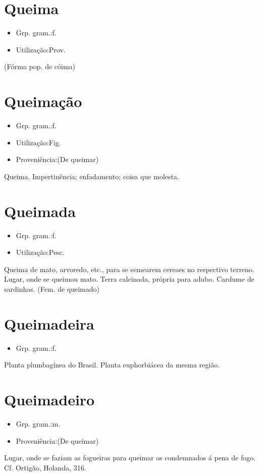 \section{Queima}
\begin{itemize}
\item {Grp. gram.:f.}
\end{itemize}
\begin{itemize}
\item {Utilização:Prov.}
\end{itemize}
(Fórma pop. de \textunderscore cóima\textunderscore )
\section{Queimação}
\begin{itemize}
\item {Grp. gram.:f.}
\end{itemize}
\begin{itemize}
\item {Utilização:Fig.}
\end{itemize}
\begin{itemize}
\item {Proveniência:(De \textunderscore queimar\textunderscore )}
\end{itemize}
Queima.
Impertinência; enfadamento; coisa que molesta.
\section{Queimada}
\begin{itemize}
\item {Grp. gram.:f.}
\end{itemize}
\begin{itemize}
\item {Utilização:Pesc.}
\end{itemize}
Queima de mato, arvoredo, etc., para se semearem cereaes no respectivo terreno.
Lugar, onde se queimou mato.
Terra calcinada, própria para adubo.
Cardume de sardinhas.
(Fem. de \textunderscore queimado\textunderscore )
\section{Queimadeira}
\begin{itemize}
\item {Grp. gram.:f.}
\end{itemize}
Planta plumbagínea do Brasil.
Planta euphorbiácea da mesma região.
\section{Queimadeiro}
\begin{itemize}
\item {Grp. gram.:m.}
\end{itemize}
\begin{itemize}
\item {Proveniência:(De \textunderscore queimar\textunderscore )}
\end{itemize}
Lugar, onde se faziam as fogueiras para queimar os condemnados á pena de fogo. Cf. Ortigão, \textunderscore Holanda\textunderscore , 316.
